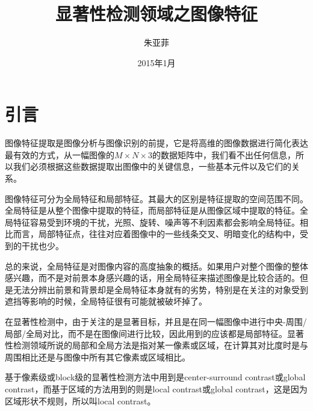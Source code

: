 \documentclass[12pt]{article}
\begin{document}
\title{\vspace{-2em}显著性检测领域之图像特征\vspace{-0.7em}}
\author{朱亚菲}
\date{\vspace{-0.7em}2015年1月\vspace{-0.7em}}
\maketitle\thispagestyle{fancy}
\maketitle
\tableofcontents 


\section{引言}

图像特征提取是图像分析与图像识别的前提，它是将高维的图像数据进行简化表达最有效的方式，从一幅图像的$M \times N \times3$的数据矩阵中，我们看不出任何信息，所以我们必须根据这些数据提取出图像中的关键信息，一些基本元件以及它们的关系。

图像特征可分为全局特征和局部特征。其最大的区别是特征提取的空间范围不同。全局特征是从整个图像中提取的特征，而局部特征是从图像区域中提取的特征。全局特征容易受到环境的干扰，光照、旋转、噪声等不利因素都会影响全局特征。相比而言，局部特征点，往往对应着图像中的一些线条交叉、明暗变化的结构中，受到的干扰也少。

总的来说，全局特征是对图像内容的高度抽象的概括。如果用户对整个图像的整体感兴趣，而不是对前景本身感兴趣的话，用全局特征来描述图像是比较合适的。但是无法分辨出前景和背景却是全局特征本身就有的劣势，特别是在关注的对象受到遮挡等影响的时候，全局特征很有可能就被破坏掉了。

在显著性检测中，由于关注的是显著目标，并且是在同一幅图像中进行中央-周围/局部/全局对比，而不是在图像间进行比较，因此用到的应该都是局部特征。显著性检测领域所说的局部和全局方法是指对某一像素或区域，在计算其对比度时是与周围相比还是与图像中所有其它像素或区域相比。

基于像素级或block级的显著性检测方法中用到是center-surround contrast或global contrast，而基于区域的方法用到的则是local contrast或global contrast，这是因为区域形状不规则，所以叫local contrast。
\end{document}
